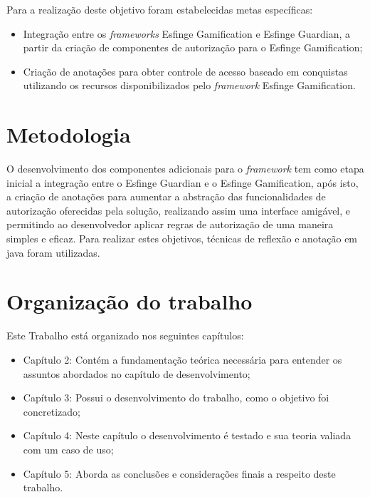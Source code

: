 \par Para a realização deste objetivo foram estabelecidas metas específicas:
\begin{itemize}
    \item Integração entre os \textit{frameworks} Esfinge Gamification e Esfinge Guardian, a partir da criação de componentes de autorização para o Esfinge Gamification;
    \item Criação de anotações para obter controle de acesso baseado em conquistas utilizando os recursos disponibilizados pelo \textit{framework} Esfinge Gamification.
\end{itemize}

\section{Metodologia}

\par O desenvolvimento dos componentes adicionais para o \textit{framework} tem como etapa inicial a integração entre o Esfinge Guardian e o Esfinge Gamification, após isto, a criação de anotações para aumentar a abstração das funcionalidades de autorização oferecidas pela solução, realizando assim uma interface amigável, e permitindo ao desenvolvedor aplicar regras de autorização de uma maneira simples e eficaz. Para realizar estes objetivos, técnicas de reflexão e anotação em java foram utilizadas.

\section{Organização do trabalho}

Este Trabalho está organizado nos seguintes capítulos:

\begin{itemize}
	\item Capítulo 2: Contém a fundamentação teórica necessária para entender os assuntos abordados no capítulo de desenvolvimento;
	\item Capítulo 3: Possui o desenvolvimento do trabalho, como o objetivo foi concretizado;
	\item Capítulo 4: Neste capítulo o desenvolvimento é testado e sua teoria valiada com um caso de uso;
	\item Capítulo 5: Aborda as conclusões e considerações finais a respeito deste trabalho.
\end{itemize}